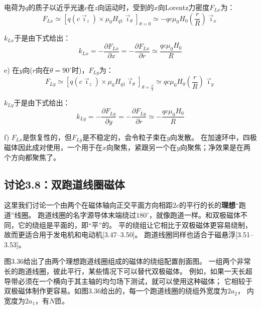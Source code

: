 电荷为$q$的质子以近乎光速$c$在$z$向运动时，受到的$x$向Lorentz力密度$F_{Lx}$为：
\begin{equation}
F_{Lx}\simeq[q(c\vec{\imath}_{z})\times\mu_{0}H_{q1}\vec{\imath}_{\theta}]_{\theta=0}
\simeq-qc\mu_{0}H_{0}\left(\frac{r}{R}\right)\vec{\imath}_{x}\tag{S9.2}%
\end{equation}

$k_{Lx}$于是由下式给出：
\begin{equation}
k_{Lx}=-\frac{\partial F_{Lx}}{\partial x}=-\frac{\partial F_{Lx}}{\partial r}
\simeq \frac{qc\mu_{0}H_{0}}{R}\tag{3.148}%
\end{equation}

e) 在$y$向($r$向在$\theta=90^\circ$时)，$F_{Ly}$为：
\begin{equation}
F_{Ly}\simeq[q(c\vec{\imath}_{z})\times\mu_{0}H_{q1}\vec{\imath}_{\theta}]_{\theta=\frac{\pi}{2}}
\simeq qc\mu_{0}H_{0}\left(\frac{r}{R}\right)\vec{\imath}_{y}\tag{S9.3}%
\end{equation}

$k_{Ly}$于是由下式给出：
\begin{equation}
k_{Ly}=-\frac{\partial F_{Ly}}{\partial y}=-\frac{\partial F_{Ly}}{\partial r}
\simeq-\frac{qc \mu_{0}H_{0}}{R}\tag{3.149}%
\end{equation}

f) $F_{Lx}$是恢复性的，但$F_{Ly}$是不稳定的，会令粒子束在$y$向发散。
在加速环中，四极磁体因此成对使用，一个用于在$x$向聚焦，紧跟另一个在$y$向聚焦；净效果是在两个方向都聚焦了。




\subsection{讨论3.8：双跑道线圈磁体}
这里我们讨论一个由两个在磁体轴向正交平面方向相距$2c$的平行的长的\textbf{理想}“跑道”线圈。
跑道线圈的名字源导体末端绕过$180^\circ$，就像跑道一样。和双极磁体不同，它的绕组是平面的，即“平”的。
平的绕组让它相比于双极磁体更容易绕制，故而更适合用于发电机和电动机[3.47–3.50]。
跑道线圈同样也适合于磁悬浮[3.51–3.53]。

图3.36给出了由两个理想跑道线圈组成的磁体的绕组配置剖面图。
一组两个非常长的跑道线圈，彼此平行，某些情况下可以替代双极磁体。
例如，如果一天长超导带必须在一个横向于其主轴的均匀场下测试，就可以使用这种磁体；
它相较于双极磁体制作更容易。如图3.36给出的，每一个跑道线圈的绕组外宽度为$2a_2$，
内宽度为$2a_1$，有$N$匝。

